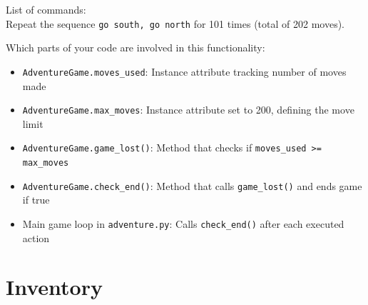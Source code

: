\documentclass[11pt]{article}
\begin{document}
List of commands:\\
Repeat the sequence \texttt{go south, go north} for 101 times (total of 202 moves).

Which parts of your code are involved in this functionality:
\begin{itemize}
    \item \texttt{AdventureGame.moves\_used}: Instance attribute tracking number of moves made
    \item \texttt{AdventureGame.max\_moves}: Instance attribute set to 200, defining the move limit
    \item \texttt{AdventureGame.game\_lost()}: Method that checks if \texttt{moves\_used >= max\_moves}
    \item \texttt{AdventureGame.check\_end()}: Method that calls \texttt{game\_lost()} and ends game if true
    \item Main game loop in \texttt{adventure.py}: Calls \texttt{check\_end()} after each executed action
\end{itemize}


\section*{Inventory}
\end{document}
